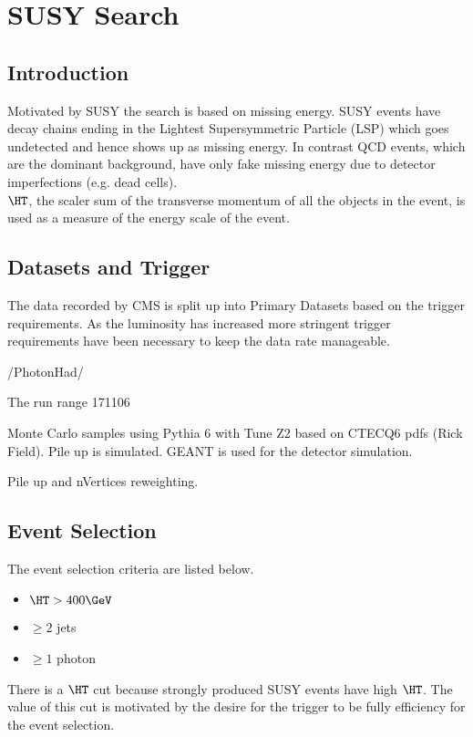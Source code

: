 \chapter{SUSY Search}

\section{Introduction}

Motivated by SUSY the search is based on missing energy. SUSY events have decay
chains ending in the Lightest Supersymmetric Particle (LSP) which goes
undetected and hence shows up as missing energy. In contrast QCD events, which
are the dominant background, have only fake missing energy due to detector
imperfections (e.g. dead cells). \\

$\HT$, the scaler sum of the transverse momentum of all the objects in the 
event, is used as a measure of the energy scale of the event.

\section{Datasets and Trigger}

The data recorded by CMS is split up into Primary Datasets based on the trigger
requirements. As the luminosity has increased more stringent trigger
requirements have been necessary to keep the data rate manageable.

/PhotonHad/

The run range 171106 

Monte Carlo samples using Pythia 6 with Tune Z2 based on CTECQ6 pdfs (Rick
Field). Pile up is simulated. GEANT is used for the detector simulation.

Pile up and nVertices reweighting.

\section{Event Selection}

The event selection criteria are listed below. 

\begin{itemize}
\item $\HT > 400 \GeV$
\item $\geq 2$ jets
\item $\geq 1$ photon
\end{itemize}

There is a $\HT$ cut because strongly produced SUSY events have high $\HT$. The 
value of this cut is motivated by the desire for the trigger to be fully 
efficiency for the event selection. \\

